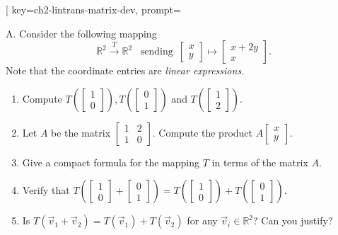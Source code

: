 \begin{SaveQuestion}[
        key=ch2-lintrans-matrix-dev,
        prompt={A.   Consider the following mapping $$\mathbb R^2 \overset{T}\longrightarrow \mathbb R^2 \,\,\,\,\,{\text{sending}} \,\,\, \begin{bmatrix}x\\y\end{bmatrix} \mapsto \begin{bmatrix}x + 2y \\ x\end{bmatrix}.$$ Note that the coordinate entries are {\it linear expressions.} \begin{enumerate}
	\item Compute $T(\begin{bmatrix}1\\0\end{bmatrix}) $,\,$T(\begin{bmatrix}0\\1\end{bmatrix} ) $ and $T( \begin{bmatrix}1\\2\end{bmatrix})$. \item Let $A$ be the matrix $ \begin{bmatrix}1 & 2 \\1 &0\end{bmatrix}. $ Compute the product $A \begin{bmatrix}x\\y\end{bmatrix}$. \item Give a compact formula for the mapping $T$ in terms of the matrix $A$. \item Verify that $T( \begin{bmatrix}1\\0\end{bmatrix} + \begin{bmatrix}0\\1\end{bmatrix}) = T( \begin{bmatrix}1\\0\end{bmatrix})+ T(\begin{bmatrix}0\\1\end{bmatrix})$. \item Is  $T(\vec v_1 + \vec v_2) = T(\vec v_1) + T(\vec v_2)$ for any $\vec v_i \in \mathbb R^2$? Can you justify? \\

\end{enumerate}}
\end{SaveQuestion}
